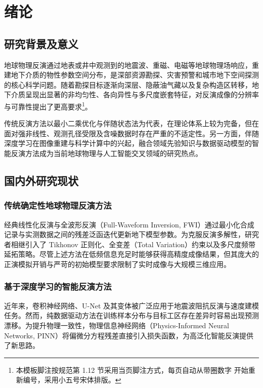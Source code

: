 \chapter{绪论}

\section{研究背景及意义}

地球物理反演通过地表或井中观测到的地震波、重磁、电磁等地球物理场响应，重建地下介质的物性参数空间分布，是深部资源勘探、灾害预警和城市地下空间探测的核心科学问题\cite{tarantola2005inverse, zhao1995mechanics}。随着勘探目标逐渐向深层、隐蔽油气藏以及复杂构造区转移，地下介质呈现出显著的非均匀性、各向异性与多尺度嵌套特征，对反演成像的分辨率与可靠性提出了更高要求\footnote{本模板脚注按规范第 1.12 节采用当页脚注方式，每页自动从带圈数字  开始重新编号，采用小五号宋体排版。}。

传统反演方法以最小二乘优化与伴随状态法为代表，在理论体系上较为完备，但在面对强非线性、观测孔径受限及含噪数据时存在严重的不适定性\cite{gbt7714, wang2023seismic}。另一方面，伴随深度学习在图像重建与科学计算中的兴起，融合领域先验知识与数据驱动模型的智能反演方法成为当前地球物理与人工智能交叉领域的研究热点\cite{raissi2019physics, zhang2024inversion}。

\section{国内外研究现状}

\subsection{传统确定性地球物理反演方法}

经典线性化反演与全波形反演（Full-Waveform Inversion, FWI）通过最小化合成记录与实测数据之间的残差泛函迭代更新地下模型参数\cite{tarantola2005inverse}。为克服反演多解性，研究者相继引入了 Tikhonov 正则化、全变差（Total Variation）约束以及多尺度频带延拓策略\cite{desmarais1992carbon, yang2021fwi}。尽管上述方法在低频信息充足时能够获得高精度成像结果，但其庞大的正演模拟开销与严苛的初始模型要求限制了实时成像与大规模三维应用。

\subsection{基于深度学习的智能反演方法}

近年来，卷积神经网络、U-Net 及其变体被广泛应用于地震波阻抗反演与速度建模任务\cite{wu2019inversionnet, li2022dl}。然而，纯数据驱动方法在训练样本分布与目标工区存在差异时容易出现预测漂移。为提升物理一致性，物理信息神经网络（Physics-Informed Neural Networks, PINN）将偏微分方程残差直接引入损失函数\cite{raissi2019physics}，为高泛化智能反演提供了新思路。

